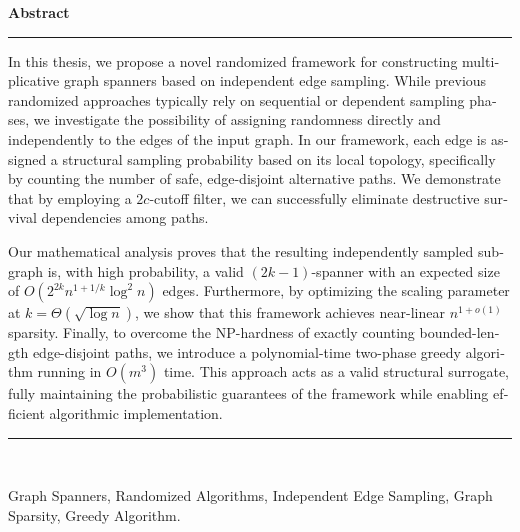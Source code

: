 \documentclass[11pt,a4paper]{report}
\theoremstyle{plain}
\theoremstyle{definition}
\theoremstyle{remark}
\begin{document}
\newpage
\vspace*{0.5cm}
\thispagestyle{fancy}
\fancyhead[RO]{}
\fancyhead[LO]{}
\fancyfoot[C]{\lr{\thepage}}
\renewcommand{\headrulewidth}{0pt}
\renewcommand{\footrulewidth}{0pt}
\begin{latin}
\begin{center}
\LARGE\textbf{Abstract}
\end{center}
\noindent\rule{\textwidth}{1pt}\par
In this thesis, we propose a novel randomized framework for constructing multiplicative graph spanners based on independent edge sampling. While previous randomized approaches typically rely on sequential or dependent sampling phases, we investigate the possibility of assigning randomness directly and independently to the edges of the input graph. In our framework, each edge is assigned a structural sampling probability based on its local topology, specifically by counting the number of safe, edge-disjoint alternative paths. We demonstrate that by employing a $2c$-cutoff filter, we can successfully eliminate destructive survival dependencies among paths. 

Our mathematical analysis proves that the resulting independently sampled subgraph is, with high probability, a valid $(2k-1)$-spanner with an expected size of $O(2^{2k} n^{1+1/k} \log^2 n)$ edges. Furthermore, by optimizing the scaling parameter at $k = \Theta(\sqrt{\log n})$, we show that this framework achieves near-linear $n^{1+o(1)}$ sparsity. Finally, to overcome the NP-hardness of exactly counting bounded-length edge-disjoint paths, we introduce a polynomial-time two-phase greedy algorithm running in $O(m^3)$ time. This approach acts as a valid structural surrogate, fully maintaining the probabilistic guarantees of the framework while enabling efficient algorithmic implementation.
\par
\vspace{-2mm}\noindent\rule{\textwidth}{1pt}\\
\begin{description}[parsep=0mm,leftmargin=0cm]
\item[Keywords:] Graph Spanners, Randomized Algorithms, Independent Edge Sampling, Graph Sparsity, Greedy Algorithm.
\end{description}
\end{latin}
\end{document}
